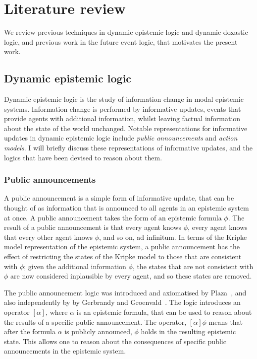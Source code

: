 \chapter{Literature review}

We review previous techniques in dynamic epistemic logic and dynamic doxastic
logic, and previous work in the future event logic, that motivates the present
work.

\section{Dynamic epistemic logic}

Dynamic epistemic logic is the study of information change in modal epistemic
systems. Information change is performed by informative updates, events that
provide agents with additional information, whilst leaving factual information
about the state of the world unchanged. Notable representations for informative
updates in dynamic epistemic logic include {\em public announcements} and {\em
action models}. I will briefly discuss these representations of informative
updates, and the logics that have been devised to reason about them.

\subsection{Public announcements}

A public announcement is a simple form of informative update, that can be
thought of as information that is announced to all agents in an epistemic system
at once. A public announcement takes the form of an epistemic formula $\phi$.
The result of a public announcement is that every agent knows $\phi$, every
agent knows that every other agent knows $\phi$, and so on, ad infinitum. In
terms of the Kripke model representation of the epistemic system, a public
announcement has the effect of restricting the states of the Kripke model to
those that are consistent with $\phi$; given the additional information $\phi$,
the states that are not consistent with $\phi$ are now considered inplausible by
every agent, and so these states are removed.

The public announcement logic was introduced and axiomatised by
Plaza~\cite{plaza2007logics}, and also independently by by Gerbrandy and
Groenvald~\cite{gerbrandy1997reasoning}.  The logic introduces an operator
$[\alpha]$, where $\alpha$ is an epistemic formula, that can be used to reason
about the results of a specific public announcement. The operator, $[\alpha]
\phi$ means that after the formula $\alpha$ is publicly announced, $\phi$ holds
in the resulting epistemic state. This allows one to reason about the
consequences of specific public announcements in the epistemic system.

